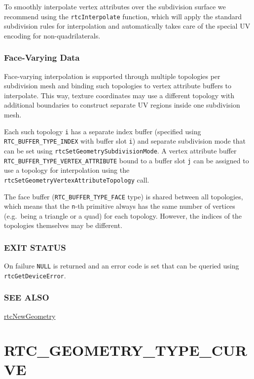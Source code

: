 To smoothly interpolate vertex attributes over the subdivision surface
we recommend using the \texttt{rtcInterpolate} function, which will
apply the standard subdivision rules for interpolation and automatically
takes care of the special UV encoding for non-quadrilaterals.

\subsubsection{Face-Varying Data}\label{face-varying-data}

Face-varying interpolation is supported through multiple topologies per
subdivision mesh and binding such topologies to vertex attribute buffers
to interpolate. This way, texture coordinates may use a different
topology with additional boundaries to construct separate UV regions
inside one subdivision mesh.

Each such topology \texttt{i} has a separate index buffer (specified
using \texttt{RTC\_BUFFER\_TYPE\_INDEX} with buffer slot \texttt{i}) and
separate subdivision mode that can be set using
\texttt{rtcSetGeometrySubdivisionMode}. A vertex attribute buffer
\texttt{RTC\_BUFFER\_TYPE\_VERTEX\_ATTRIBUTE} bound to a buffer slot
\texttt{j} can be assigned to use a topology for interpolation using the
\texttt{rtcSetGeometryVertexAttributeTopology} call.

The face buffer (\texttt{RTC\_BUFFER\_TYPE\_FACE} type) is shared
between all topologies, which means that the \texttt{n}-th primitive
always has the same number of vertices (e.g.~being a triangle or a quad)
for each topology. However, the indices of the topologies themselves may
be different.

\subsubsection{EXIT STATUS}\label{exit-status}

On failure \texttt{NULL} is returned and an error code is set that can
be queried using \texttt{rtcGetDeviceError}.

\subsubsection{SEE ALSO}\label{see-also}

\hyperref[rtcnewgeometry]{rtcNewGeometry}

\pagebreak

\section{RTC\_GEOMETRY\_TYPE\_CURVE}\label{rtc_geometry_type_curve}

